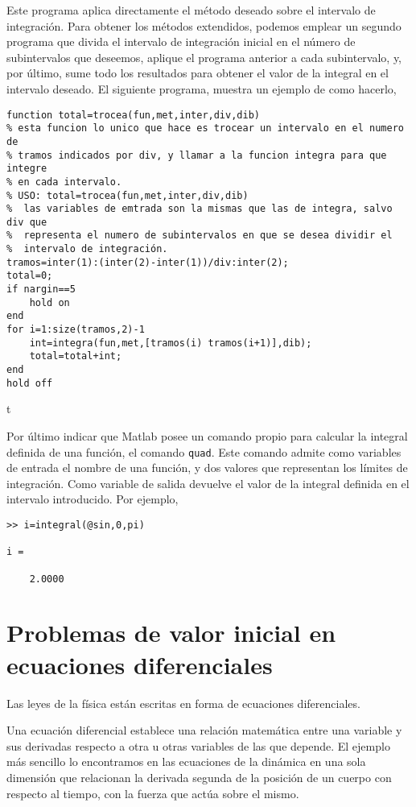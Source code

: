 Este programa aplica directamente el método deseado sobre el intervalo de integración. Para obtener los métodos extendidos, podemos emplear un segundo programa que divida el intervalo de integración inicial en el número de subintervalos que deseemos, aplique el programa anterior a cada subintervalo, y, por último, sume todo los resultados para obtener el valor de la integral en el intervalo deseado. El siguiente programa, muestra un ejemplo de como hacerlo,

\begin{lstlisting}
function total=trocea(fun,met,inter,div,dib)
% esta funcion lo unico que hace es trocear un intervalo en el numero de
% tramos indicados por div, y llamar a la funcion integra para que integre
% en cada intervalo.
% USO: total=trocea(fun,met,inter,div,dib)
%  las variables de emtrada son la mismas que las de integra, salvo div que
%  representa el numero de subintervalos en que se desea dividir el
%  intervalo de integración.
tramos=inter(1):(inter(2)-inter(1))/div:inter(2);
total=0;
if nargin==5
    hold on
end
for i=1:size(tramos,2)-1
    int=integra(fun,met,[tramos(i) tramos(i+1)],dib);
    total=total+int;
end
hold off
\end{lstlisting}t

Por último indicar que Matlab posee un comando propio para calcular la integral definida de una función, el comando \texttt{quad}. Este comando admite como variables de entrada el nombre de una función, y dos valores que representan los límites de integración. Como variable de salida devuelve el valor de la integral definida en el intervalo introducido. Por ejemplo,

\begin{verbatim}
>> i=integral(@sin,0,pi)

i =

    2.0000
\end{verbatim}


\section{Problemas de valor inicial en ecuaciones diferenciales}
Las leyes de la física están escritas en forma de ecuaciones diferenciales.  

Una ecuación diferencial establece una relación matemática entre una variable y sus derivadas respecto a otra u otras variables de las que depende. El ejemplo más sencillo lo encontramos en las ecuaciones de la dinámica en una sola dimensión que relacionan la derivada segunda de la posición de un cuerpo con respecto al tiempo, con la fuerza que actúa sobre el mismo.

